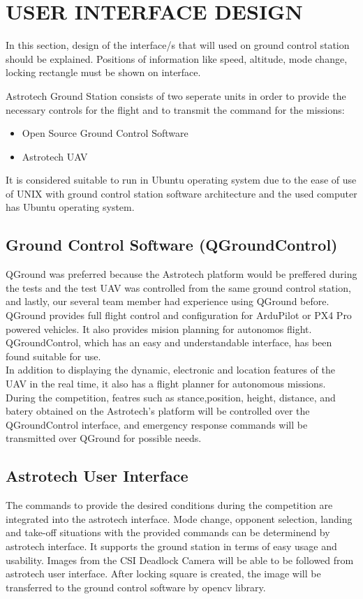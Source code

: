 \documentclass[12pt]{article}
\begin{document}
\section{USER INTERFACE DESIGN}
In this section, design of the interface/s that will used on ground control station should be explained. Positions of information like speed, altitude, mode change, locking rectangle must be shown on interface.

Astrotech Ground Station consists of two seperate units in order to provide the necessary controls for the flight and to transmit the command for the missions:

\begin{itemize}
	\item Open Source Ground Control Software
	\item Astrotech UAV
\end{itemize}

It is considered suitable to run in Ubuntu operating system due to the ease of use of UNIX with ground control station software architecture and the used computer has Ubuntu operating system.

\subsection{Ground Control Software (QGroundControl)}
QGround was preferred because the Astrotech platform would be preffered during the tests and the test UAV was controlled from the same ground control station, and lastly, our several team member had experience using QGround before. QGround provides full flight control and configuration for ArduPilot or PX4 Pro powered vehicles. It also provides mision planning for autonomos flight. QGroundControl, which has an easy and understandable interface, has been found suitable for use.     \\ 

In addition to displaying the dynamic, electronic and location features of the UAV in the real time, it also has a flight planner for autonomous missions. During the competition, featres such as stance,position, height, distance, and batery obtained on the Astrotech’s platform will be controlled over the QGroundControl interface, and emergency response commands will be transmitted over QGround for possible needs.

\subsection*{Astrotech User Interface}
The commands to provide the desired conditions during the competition are integrated into the astrotech interface. Mode change, opponent selection, landing and take-off situations with the provided commands can be determinend by astrotech interface. It supports the ground station in terms of easy usage and usability.     
     Images from the CSI Deadlock Camera will be able to be followed from astrotech user interface. After locking square is created, the image will be transferred to the ground control software by opencv library.
\end{document}
